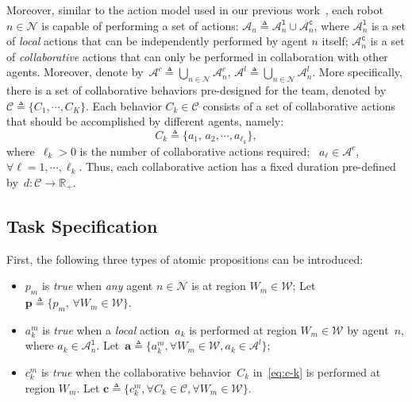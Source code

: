 Moreover, similar to the action model used in our previous work~\cite{guo2016task},
each robot $n\in \mathcal{N}$ is capable of performing a set of actions:
$\mathcal{A}_n\triangleq \mathcal{A}^{\texttt{l}}_n \cup \mathcal{A}^{\texttt{c}}_n$,
where $\mathcal{A}^{\texttt{l}}_n$ is a set of \emph{local} actions that can be independently performed by agent $n$ itself;
$\mathcal{A}^{\texttt{c}}_n$ is a set of \emph{collaborative} actions that can only be performed
in collaboration with other agents.
Moreover, denote by~$\mathcal{A}^c\triangleq\bigcup_{n\in\mathcal{N}}\mathcal{A}^c_n$,
$\mathcal{A}^l\triangleq\bigcup_{n\in\mathcal{N}}\mathcal{A}^l_n$.
More specifically,
there is a set of collaborative behaviors pre-designed for the team,
denoted by~$\mathcal{C}\triangleq \{C_1,\cdots, C_K\}$. 
Each behavior $C_k\in \mathcal{C}$ consists of a set of collaborative actions
that should be accomplished by different agents, namely:
\begin{equation}\label{eq:c-k}
C_k\triangleq \{a_1,\,a_2,\cdots,a_{\ell_k}\},
\end{equation}
where~$\ell_k>0$ is the number of collaborative actions required;
~$a_{\ell}\in \mathcal{A}^c$, $\forall \ell=1,\cdots,\ell_k$.
Thus, each collaborative action has a fixed duration pre-defined by~$d:\mathcal{C}\rightarrow \mathbb{R}_{+}$.

 



\subsection{Task Specification}\label{subsec:task-specification}
First, the following three types of atomic propositions can be introduced:
\begin{itemize}
\item $p_m$ is \emph{true} when \emph{any} agent $n\in \mathcal{N}$ is at region ${W}_m\in {\mathcal{W}}$;
Let $\mathbf{p}\triangleq \{p_m,\, \forall {W}_m \in {\mathcal{W}}\}$.
\item $a^m_k$ is \emph{true} when a \emph{local} action~$a_k$ is performed at region ${W}_m\in{\mathcal{W}}$ by
 agent~$n$, where $a_k \in \mathcal{A}_n^{\texttt{l}}$.
Let~$\mathbf{a} \triangleq\{a^m_k,\forall {W}_m \in \mathcal{W}, a_k\in \mathcal{A}^{l}\}$;
\item $c^m_k$ is \emph{true} when the collaborative behavior~$C_k$ in~\eqref{eq:c-k} is performed at region $W_m$.
Let $\mathbf{c} \triangleq\{c^m_k,\forall C_k \in \mathcal{C},\forall {W}_m \in {\mathcal{W}}\}$.
\end{itemize}

